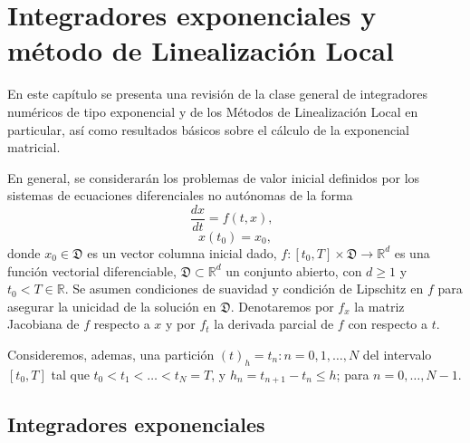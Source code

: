 \chapter{Integradores exponenciales y método de Linealización Local}\label{chapter:exp-int-and-ll-methods}

En este capítulo se presenta una revisión de la clase general de  integradores numéricos de tipo exponencial y de los Métodos de Linealización Local en particular, así como resultados básicos sobre el cálculo de la exponencial matricial.

En general, se considerarán los problemas de valor inicial definidos por los sistemas de ecuaciones diferenciales no autónomas de la forma
 \begin{equation}
 \frac{dx}{dt}=f(t,x), \;\; \label{ODE-SYST}
 \end{equation}
 \begin{equation*}
 x(t_0)=x_0,
 \end{equation*}
 donde $x_0\in \mathfrak{D}$ es un vector columna inicial dado, $f: [t_0,T] \times \mathfrak{D}\longrightarrow \mathbb{R}^{d}$ es una función vectorial diferenciable, $\mathfrak{D}\subset\mathbb{R}^{d}$ un conjunto abierto, con $d\geq 1$ y $t_0<T \in \mathbb{R}$. Se asumen condiciones de suavidad y condición de Lipschitz en $f$ para asegurar la unicidad de la solución en $\mathfrak{D}$. Denotaremos por $f_x$ la matriz Jacobiana de $f$ respecto a $x$ y por $f_t$ la derivada parcial de $f$ con respecto a $t$.

Consideremos, ademas, una partición $(t)_{h}={t_{n}:n=0,1,\ldots,N}$ del
intervalo $[t_{0},T]$ tal que $t_{0}<t_{1}<\ldots<t_{N}=T$, y $%
h_{n}=t_{n+1}-t_{n}\leq h$; para $n=0,\ldots,N-1$.

\section{Integradores exponenciales} \label{Sec:IE}

